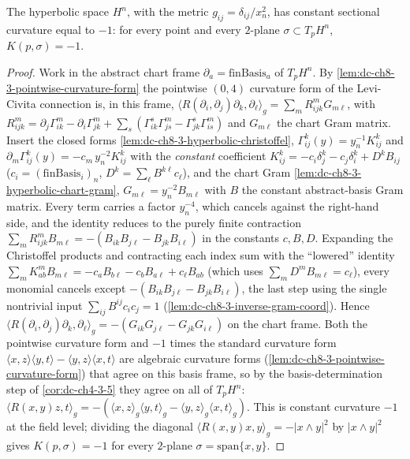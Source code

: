\begin{proposition}
  \label{prop:dc-ch8-3-const-curv}


  The hyperbolic space $H^n$, with the metric $g_{ij}=\delta_{ij}/x_n^2$, has
  constant sectional curvature equal to $-1$: for every point and every
  $2$-plane $\sigma\subset T_pH^n$, $K(p,\sigma)=-1$.
\end{proposition}
\begin{proof}

\sketch
  Work in the abstract chart frame $\partial_a=\text{finBasis}_a$ of $T_pH^n$. By
  \cref{lem:dc-ch8-3-pointwise-curvature-form} the pointwise $(0,4)$ curvature form
  of the Levi-Civita connection is, in this frame,
  $\langle R(\partial_i,\partial_j)\partial_k,\partial_\ell\rangle_g=\sum_m
  R^m_{ijk}G_{m\ell}$, with $R^m_{ijk}=\partial_j\Gamma^m_{ik}-\partial_i\Gamma^m_{jk}
  +\sum_s(\Gamma^s_{ik}\Gamma^m_{js}-\Gamma^s_{jk}\Gamma^m_{is})$ and $G_{m\ell}$
  the chart Gram matrix. Insert the closed forms
  \cref{lem:dc-ch8-3-hyperbolic-christoffel}, $\Gamma^k_{ij}(y)=y_n^{-1}K^k_{ij}$
  and $\partial_m\Gamma^k_{ij}(y)=-c_m\,y_n^{-2}K^k_{ij}$ with the \emph{constant}
  coefficient $K^k_{ij}=-c_i\delta^k_j-c_j\delta^k_i+D^kB_{ij}$
  ($c_i=(\text{finBasis}_i)_n$, $D^k=\sum_\ell B^{k\ell}c_\ell$), and the chart Gram
  \cref{lem:dc-ch8-3-hyperbolic-chart-gram}, $G_{m\ell}=y_n^{-2}B_{m\ell}$ with $B$
  the constant abstract-basis Gram matrix. Every term carries a factor $y_n^{-4}$,
  which cancels against the right-hand side, and the identity reduces to the purely
  finite contraction $\sum_m R^m_{ijk}B_{m\ell}=-(B_{ik}B_{j\ell}-B_{jk}B_{i\ell})$
  in the constants $c,B,D$. Expanding the Christoffel products and contracting each
  index sum with the ``lowered'' identity $\sum_m K^m_{ab}B_{m\ell}=-c_aB_{b\ell}
  -c_bB_{a\ell}+c_\ell B_{ab}$ (which uses $\sum_m D^mB_{m\ell}=c_\ell$), every
  monomial cancels except $-(B_{ik}B_{j\ell}-B_{jk}B_{i\ell})$, the last step using
  the single nontrivial input $\sum_{ij}B^{ij}c_ic_j=1$
  (\cref{lem:dc-ch8-3-inverse-gram-coord}). Hence
  $\langle R(\partial_i,\partial_j)\partial_k,\partial_\ell\rangle_g
  =-(G_{ik}G_{j\ell}-G_{jk}G_{i\ell})$ on the chart frame. Both the pointwise
  curvature form and $-1$ times the standard curvature form
  $\langle x,z\rangle\langle y,t\rangle-\langle y,z\rangle\langle x,t\rangle$ are
  algebraic curvature forms (\cref{lem:dc-ch8-3-pointwise-curvature-form}) that
  agree on this basis frame, so by the basis-determination step of
  \cref{cor:dc-ch4-3-5} they agree on all of $T_pH^n$:
  $\langle R(x,y)z,t\rangle_g=-(\langle x,z\rangle_g\langle y,t\rangle_g
  -\langle y,z\rangle_g\langle x,t\rangle_g)$. This is constant curvature $-1$ at the
  field level; dividing the diagonal $\langle R(x,y)x,y\rangle_g=-|x\wedge y|^2$ by
  $|x\wedge y|^2$ gives $K(p,\sigma)=-1$ for every $2$-plane
  $\sigma=\mathrm{span}\{x,y\}$.
\end{proof}


